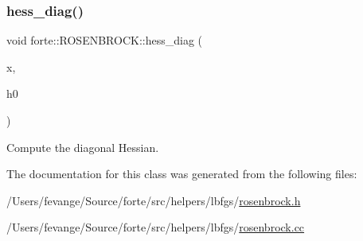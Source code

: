 \mbox{\label{classforte_1_1_r_o_s_e_n_b_r_o_c_k_a537d1edd545f8ada23022f77f39ae856}} 
\subsubsection{\texorpdfstring{hess\+\_\+diag()}{hess\_diag()}}
{\footnotesize\ttfamily void forte\+::\+R\+O\+S\+E\+N\+B\+R\+O\+C\+K\+::hess\+\_\+diag (\begin{DoxyParamCaption}\item[{psi\+::\+Shared\+Vector}]{x,  }\item[{psi\+::\+Shared\+Vector}]{h0 }\end{DoxyParamCaption})}



Compute the diagonal Hessian. 



The documentation for this class was generated from the following files\+:\begin{DoxyCompactItemize}
\item 
/\+Users/fevange/\+Source/forte/src/helpers/lbfgs/\mbox{\hyperlink{rosenbrock_8h}{rosenbrock.\+h}}\item 
/\+Users/fevange/\+Source/forte/src/helpers/lbfgs/\mbox{\hyperlink{rosenbrock_8cc}{rosenbrock.\+cc}}\end{DoxyCompactItemize}
